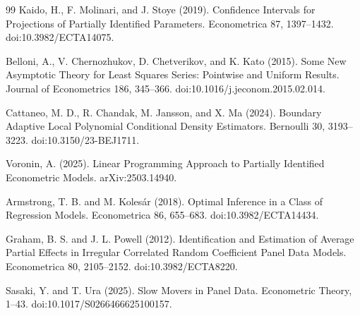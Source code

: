 \documentclass{article}
\begin{document}
\begin{thebibliography}{99}
   Kaido, H., F. Molinari, and J. Stoye (2019). Confidence Intervals for Projections of Partially Identified Parameters. Econometrica 87, 1397--1432. doi:10.3982/ECTA14075.

   Belloni, A., V. Chernozhukov, D. Chetverikov, and K. Kato (2015). Some New Asymptotic Theory for Least Squares Series: Pointwise and Uniform Results. Journal of Econometrics 186, 345--366. doi:10.1016/j.jeconom.2015.02.014.

   Cattaneo, M. D., R. Chandak, M. Jansson, and X. Ma (2024). Boundary Adaptive Local Polynomial Conditional Density Estimators. Bernoulli 30, 3193--3223. doi:10.3150/23-BEJ1711.

   Voronin, A. (2025). Linear Programming Approach to Partially Identified Econometric Models. arXiv:2503.14940.

   Armstrong, T. B. and M. Kolesár (2018). Optimal Inference in a Class of Regression Models. Econometrica 86, 655--683. doi:10.3982/ECTA14434.

   Graham, B. S. and J. L. Powell (2012). Identification and Estimation of Average Partial Effects in Irregular Correlated Random Coefficient Panel Data Models. Econometrica 80, 2105--2152. doi:10.3982/ECTA8220.

   Sasaki, Y. and T. Ura (2025). Slow Movers in Panel Data. Econometric Theory, 1--43. doi:10.1017/S0266466625100157.

\end{thebibliography}
\end{document}
